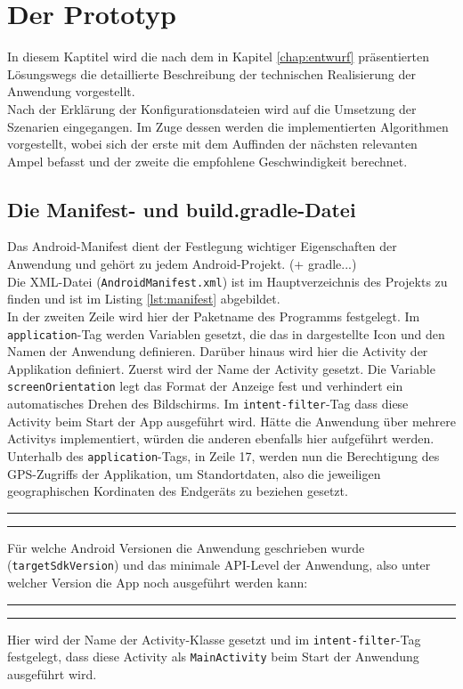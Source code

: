 \chapter{\label{chap:implementierung}Der Prototyp}
In diesem Kaptitel wird die nach dem in Kapitel \ref{chap:entwurf} präsentierten Lösungswegs die detaillierte Beschreibung der technischen Realisierung der Anwendung vorgestellt.\\
Nach der Erklärung der Konfigurationsdateien wird auf die Umsetzung der Szenarien eingegangen. Im Zuge dessen werden die implementierten Algorithmen vorgestellt, wobei sich der erste mit dem Auffinden der nächsten relevanten Ampel befasst und der zweite die empfohlene Geschwindigkeit berechnet.
\section{Die Manifest- und build.gradle-Datei}
Das Android-Manifest dient der Festlegung wichtiger Eigenschaften der Anwendung und gehört zu jedem Android-Projekt. (+ gradle...)\\

Die \gls{XML}-Datei (\texttt{AndroidManifest.xml}) ist im Hauptverzeichnis des Projekts zu finden und ist im Listing \ref{lst:manifest} abgebildet. \\
In der zweiten Zeile wird hier der Paketname des Programms festgelegt. 
Im \texttt{application}-Tag werden Variablen gesetzt, die das in dargestellte Icon und den Namen der Anwendung definieren. Darüber hinaus wird hier die \gls{Activity} der Applikation definiert. Zuerst wird der Name der \gls{Activity} gesetzt. Die Variable \texttt{screenOrientation} legt das Format der Anzeige fest und verhindert ein automatisches Drehen des Bildschirms. Im \texttt{intent-filter}-Tag dass diese Activity beim Start der App ausgeführt wird. Hätte die Anwendung über mehrere \glspl{Activity} implementiert, würden die anderen ebenfalls hier aufgeführt werden.\\
Unterhalb des \texttt{application}-Tags, in Zeile 17, werden nun die Berechtigung des \gls{GPS}-Zugriffs der Applikation, um Standortdaten, also die jeweiligen geographischen Kordinaten des Endgeräts zu beziehen gesetzt.
\begin{center}
\rule{35em}{0.5pt} 
 \rule{35em}{0.5pt}
\end{center}
Für welche Android Versionen die Anwendung geschrieben wurde (\texttt{targetSdkVersion}) und das minimale \gls{API}-Level der Anwendung, also unter welcher Version die App noch ausgeführt werden kann:
\begin{center}
\rule{35em}{0.5pt}  \rule{35em}{0.5pt}
\end{center}
Hier wird der Name der \gls{Activity}-Klasse gesetzt und im \texttt{intent-filter}-Tag festgelegt, dass diese \gls{Activity} als \texttt{MainActivity} beim Start der Anwendung ausgeführt wird. 
%
%
